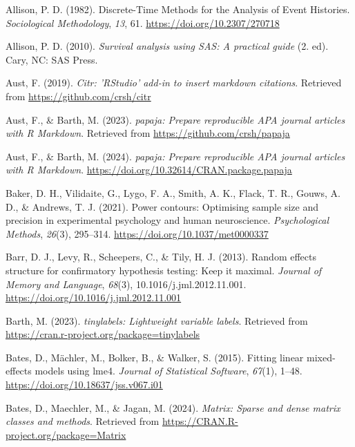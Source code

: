 \documentclass[
  man, donotrepeattitle,floatsintext]{apa6}
\newlength{\cslhangindent}
\newenvironment{CSLReferences}[2] %
 {\begin{list}{}{%
  \setlength{\itemindent}{0pt}
  \setlength{\leftmargin}{0pt}
  \setlength{\parsep}{0pt}
  \ifodd #1
   \setlength{\leftmargin}{\cslhangindent}
   \setlength{\itemindent}{-1\cslhangindent}
  \fi
  \setlength{\itemsep}{#2\baselineskip}}}
 {\end{list}}
\begin{document}
\label{refs}
\begin{CSLReferences}{1}{0}
Allison, P. D. (1982). Discrete-{Time Methods} for the {Analysis} of {Event Histories}. \emph{Sociological Methodology}, \emph{13}, 61. \url{https://doi.org/10.2307/270718}

Allison, P. D. (2010). \emph{Survival analysis using {SAS}: A practical guide} (2. ed). Cary, NC: SAS Press.

Aust, F. (2019). \emph{Citr: 'RStudio' add-in to insert markdown citations}. Retrieved from \url{https://github.com/crsh/citr}

Aust, F., \& Barth, M. (2023). \emph{{papaja}: {Prepare} reproducible {APA} journal articles with {R Markdown}}. Retrieved from \url{https://github.com/crsh/papaja}

Aust, F., \& Barth, M. (2024). \emph{{papaja}: {Prepare} reproducible {APA} journal articles with {R Markdown}}. \url{https://doi.org/10.32614/CRAN.package.papaja}

Baker, D. H., Vilidaite, G., Lygo, F. A., Smith, A. K., Flack, T. R., Gouws, A. D., \& Andrews, T. J. (2021). Power contours: {Optimising} sample size and precision in experimental psychology and human neuroscience. \emph{Psychological Methods}, \emph{26}(3), 295--314. \url{https://doi.org/10.1037/met0000337}

Barr, D. J., Levy, R., Scheepers, C., \& Tily, H. J. (2013). Random effects structure for confirmatory hypothesis testing: {Keep} it maximal. \emph{Journal of Memory and Language}, \emph{68}(3), 10.1016/j.jml.2012.11.001. \url{https://doi.org/10.1016/j.jml.2012.11.001}

Barth, M. (2023). \emph{{tinylabels}: Lightweight variable labels}. Retrieved from \url{https://cran.r-project.org/package=tinylabels}

Bates, D., Mächler, M., Bolker, B., \& Walker, S. (2015). Fitting linear mixed-effects models using {lme4}. \emph{Journal of Statistical Software}, \emph{67}(1), 1--48. \url{https://doi.org/10.18637/jss.v067.i01}

Bates, D., Maechler, M., \& Jagan, M. (2024). \emph{Matrix: Sparse and dense matrix classes and methods}. Retrieved from \url{https://CRAN.R-project.org/package=Matrix}


\end{CSLReferences}
\end{document}

